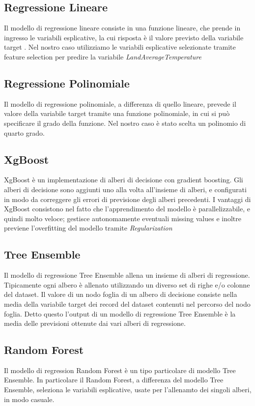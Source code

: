 \documentclass[12pt, a4paper, twocolumn]{article} %
\begin{document}
\subsection{Regressione Lineare}
Il modello di regressione lineare consiste in una funzione lineare, che prende in ingresso le variabili esplicative, la cui risposta è il valore previsto della variabile target \cite{}. Nel nostro caso utilizziamo le variabili esplicative selezionate tramite feature selection per predire la variabile \textit{LandAverageTemperature}
\subsection{Regressione Polinomiale}
Il modello di regressione polinomiale, a differenza di quello lineare, prevede il valore della variabile target tramite una funzione polinomiale, in cui si può specificare il grado della funzione. Nel nostro caso è stato scelta un polinomio di quarto grado.
\subsection{XgBoost}
XgBoost è un implementazione di alberi di decisione con gradient boosting. Gli alberi di decisione sono aggiunti uno alla volta all'insieme di alberi, e configurati in modo da correggere gli errori di previsione degli alberi precedenti. I vantaggi di XgBoost consistono nel fatto che l'apprendimento del modello è parallelizzabile, e quindi molto veloce; gestisce autonomamente eventuali missing values e inoltre previene l'overfitting del modello tramite \textit{Regularization}
\subsection{Tree Ensemble}
Il modello di regressione Tree Ensemble allena un insieme di alberi di regressione. Tipicamente ogni albero è allenato utilizzando un diverso set di righe e/o colonne del dataset. Il valore di un nodo foglia di un albero di decisione consiste nella media della variabile target dei record del dataset contenuti nel percorso del nodo foglia. Detto questo l'output di un modello di regressione Tree Ensemble è la media delle previsioni ottenute dai vari alberi di regressione.
\subsection{Random Forest}
Il modello di regression Random Forest è un tipo particolare di modello Tree Ensemble. In particolare il Random Forest, a differenza del modello Tree Ensemble, seleziona le variabili esplicative, usate per l'allenamto dei singoli alberi, in modo casuale.
\end{document}
